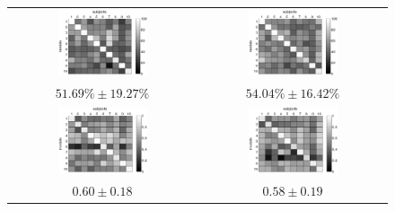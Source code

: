 \documentclass{article}
\begin{document}

\begin{figure}[!ht] \centering
  \begin{tabular}{cc}
    \includegraphics[width=0.50\textwidth]{crossClass1.eps} & 
    \includegraphics[width=0.50\textwidth]{crossClass2.eps} \\
    $51.69\% \pm 19.27\%$ & $54.04\% \pm 16.42\%$ \\
    \includegraphics[width=0.50\textwidth]{crossRegr1.eps} & 
    \includegraphics[width=0.50\textwidth]{crossRegr2.eps} \\
    $0.60 \pm 0.18$ & $0.58 \pm 0.19$ \\
  \end{tabular}
\end{figure}
\end{document}
